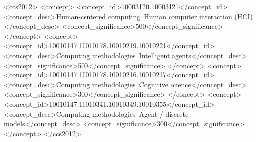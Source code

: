 %
%

\begin{CCSXML}
<ccs2012>
<concept>
<concept_id>10003120.10003121</concept_id>
<concept_desc>Human-centered computing~Human computer interaction (HCI)</concept_desc>
<concept_significance>500</concept_significance>
</concept>
<concept>
<concept_id>10010147.10010178.10010219.10010221</concept_id>
<concept_desc>Computing methodologies~Intelligent agents</concept_desc>
<concept_significance>500</concept_significance>
</concept>
<concept>
<concept_id>10010147.10010178.10010216.10010217</concept_id>
<concept_desc>Computing methodologies~Cognitive science</concept_desc>
<concept_significance>300</concept_significance>
</concept>
<concept>
<concept_id>10010147.10010341.10010349.10010355</concept_id>
<concept_desc>Computing methodologies~Agent / discrete models</concept_desc>
<concept_significance>300</concept_significance>
</concept>
</ccs2012>
\end{CCSXML}


%
%